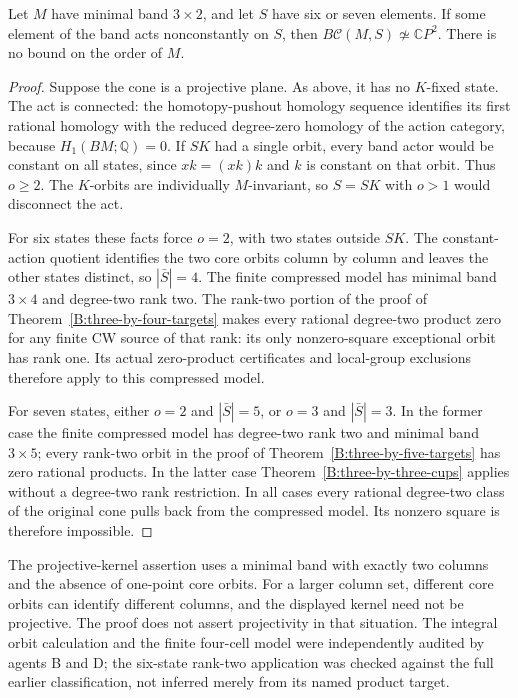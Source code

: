 \begin{corollary}
\label{C:three-row-six-seven-nonconstant}
Let $M$ have minimal band $3\times2$, and let $S$ have six or
seven elements.  If some element of the band acts nonconstantly
on $S$, then $B\mathcal C(M,S)\not\simeq\mathbb CP^2$.
There is no bound on the order of $M$.
\end{corollary}
\begin{proof}
Suppose the cone is a projective plane.  As above, it has no
$K$-fixed state.  The act is connected: the homotopy-pushout
homology sequence identifies its first rational homology with
the reduced degree-zero homology of the action category, because
$H_1(BM;\mathbb Q)=0$.
If $SK$ had a single orbit, every band actor would be constant
on all states, since $xk=(xk)k$ and $k$ is constant on that orbit.
Thus $o\geq2$.  The $K$-orbits are individually $M$-invariant,
so $S=SK$ with $o>1$ would disconnect the act.

For six states these facts force $o=2$, with two states outside
$SK$.  The constant-action quotient identifies the two core
orbits column by column and leaves the other states distinct,
so $|\bar S|=4$.  The finite compressed model has minimal band
$3\times4$ and degree-two rank two.  The rank-two portion of
the proof of Theorem~\ref{B:three-by-four-targets} makes every
rational degree-two product zero for any finite CW source of
that rank: its only nonzero-square exceptional orbit has rank
one.  Its actual zero-product certificates and local-group
exclusions therefore apply to this compressed model.

For seven states, either $o=2$ and $|\bar S|=5$, or $o=3$ and
$|\bar S|=3$.  In the former case the finite compressed model
has degree-two rank two and minimal band $3\times5$; every
rank-two orbit in the proof of
Theorem~\ref{B:three-by-five-targets} has zero rational products.
In the latter case Theorem~\ref{B:three-by-three-cups} applies
without a degree-two rank restriction.
In all cases every rational degree-two class of the original
cone pulls back from the compressed model.  Its nonzero square
is therefore impossible.
\end{proof}

\begin{remark}
\label{C:two-column-orbit-quotient-scope}
The projective-kernel assertion uses a minimal band with exactly
two columns and the absence of one-point core orbits.  For a
larger column set, different core orbits can identify different
columns, and the displayed kernel need not be projective.
The proof does not assert projectivity in that situation.
The integral orbit calculation and the finite four-cell model
were independently audited by agents B and D; the six-state
rank-two application was checked against the full earlier
classification, not inferred merely from its named product target.
\end{remark}
